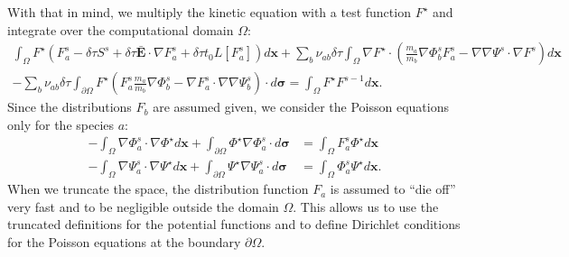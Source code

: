 \documentclass[reprint]{revtex4}
\begin{document}
 With that in mind, we multiply the kinetic equation with a test function $F^{\star}$ and integrate over the computational domain $\Omega$:
\begin{multline}
\int_{\Omega}F^{\star}\left(F_a^s -\delta\tau S^s+\delta\tau\bar{\bm{E}}\cdot\nabla F_a^s+\delta\tau t_0L[F_a^s]\right)d\bm{x}
+\sum_b\nu_{ab}\delta\tau\int_{\Omega}\nabla F^{\star}\cdot\left(\frac{m_a}{m_b}\nabla \Phi_b^s F_a^s-\nabla\nabla\Psi^s\cdot\nabla F^s\right)d\bm{x}\\
-\sum_b\nu_{ab}\delta\tau\int_{\partial\Omega}F^{\star}\left(F_a^s\frac{m_a}{m_b}\nabla\Phi_b^s-\nabla F_a^s\cdot\nabla\nabla\Psi_b^s\right)\cdot d\bm{\sigma}
=\int_{\Omega}F^{\star}F^{s-1}d\bm{x}.
\end{multline}
Since the distributions $F_b$ are assumed given, we consider the Poisson equations only for the species $a$:
\begin{align}
-\int_{\Omega}\nabla\Phi_a^s\cdot\nabla\Phi^{\star}d\bm{x}+\int_{\partial\Omega}\Phi^{\star}\nabla\Phi_a^s\cdot d\bm{\sigma}&=\int_{\Omega}F_a^s\Phi^{\star}d\bm{x}\\
-\int_{\Omega}\nabla\Psi_a^s\cdot\nabla\Psi^{\star}d\bm{x}+\int_{\partial\Omega}\Psi^{\star}\nabla\Psi_a^s\cdot d\bm{\sigma}&=\int_{\Omega}\Phi_a^s\Psi^{\star}d\bm{x}.
\end{align}
When we truncate the space, the distribution function $F_a$ is assumed to ``die off'' very fast and to be negligible outside the domain $\Omega$. This allows us to use the truncated definitions for the potential functions and to define Dirichlet conditions for the Poisson equations at the boundary $\partial\Omega$. 
\end{document}
